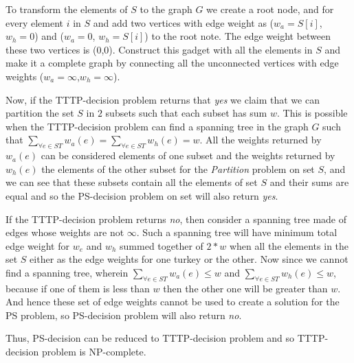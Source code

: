 \documentclass[8pt]{article}
\begin{document}
To transform the elements of $S$ to the graph $G$ we create a root node, and for every element $i$ in $S$ and add two vertices with edge weight as ($w_a = S[i]$, $w_h = 0$) and ($w_a = 0$, $w_h = S[i]$) to the root note. The edge weight between these two vertices is (0,0). Construct this gadget with all the elements in $S$ and make it a complete graph by connecting all the unconnected vertices with edge weights ($w_a = \infty$,$w_h = \infty$).

Now, if the TTTP-decision problem returns that \textit{yes} we claim that we can partition the set $S$ in $2$ subsets such that each subset has sum $w$. This is possible when the TTTP-decision problem can find a spanning tree in the graph $G$ such that $\sum_{\forall e \in ST}{w_a(e)} = \sum_{\forall e \in ST}{w_h(e)} = w$. All the weights returned by $w_a(e)$ can be considered elements of one subset and the weights returned by $w_h(e)$ the elements of the other subset for the \textit{Partition} problem on set $S$, and we can see that these subsets contain all the elements of set $S$ and their sums are equal and so the PS-decision problem on set will also return \textit{yes}.

If the TTTP-decision problem returns \textit{no}, then consider a spanning tree made of edges whose weights are not $\infty$. Such a spanning tree will have minimum total edge weight for $w_e$ and $w_h$ summed together of $2*w$ when all the elements in the set $S$ either as the edge weights for one turkey or the other. Now since we cannot find a spanning tree, wherein $\sum_{\forall e \in ST}{w_a(e)} \leq w$ and $\sum_{\forall e \in ST}{w_h(e)} \leq w$, because if one of them is less than $w$ then the other one will be greater than $w$. And hence these set of edge weights cannot be used to create a solution for the PS problem, so PS-decision problem will also return \textit{no}.

Thus, PS-decision can be reduced to TTTP-decision problem and so TTTP-decision problem is NP-complete.
\end{document}
